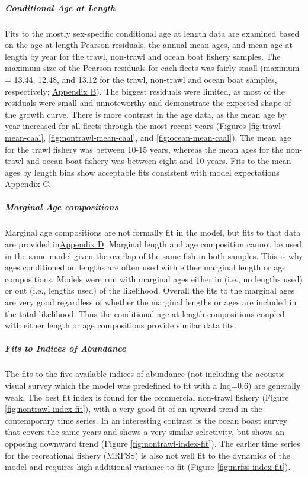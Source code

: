 \documentclass[11pt,
  letterpaper,
]{article}
\begin{document}
\hypertarget{conditional-age-at-length}{%
\subparagraph{Conditional Age at Length}\label{conditional-age-at-length}}

Fits to the mostly sex-specific conditional age at length data are examined based on the age-at-length Pearson residuals, the annual mean ages, and mean age at length by year for the trawl, non-trawl and ocean boat fishery samples. The maximum size of the Pearson residuals for each fleets was fairly small (maximum = 13.44, 12.48, and 13.12 for the trawl, non-trawl and ocean boat samples, respectively; \protect\hyperlink{app_b}{Appendix B}). The biggest residuals were limited, as most of the residuals were small and unnoteworthy and demonstrate the expected shape of the growth curve. There is more contrast in the age data, as the mean age by year increased for all fleets through the most recent years (Figures \ref{fig:trawl-mean-caal}, \ref{fig:nontrawl-mean-caal}, and \ref{fig:ocean-mean-caal}). The mean age for the trawl fishery was between 10-15 years, whereas the mean ages for the non-trawl and ocean boat fishery was between eight and 10 years. Fits to the mean ages by length bins show acceptable fits consistent with model expectations \protect\hyperlink{app_c}{Appendix C}.

\hypertarget{marginal-age-compositions}{%
\subparagraph{Marginal Age compositions}\label{marginal-age-compositions}}

Marginal age compositions are not formally fit in the model, but fits to that data are provided in\protect\hyperlink{app_d}{Appendix D}. Marginal length and age composition cannot be used in the same model given the overlap of the same fish in both samples. This is why ages conditioned on lengths are often used with either marginal length or age compositions. Models were run with marginal ages either in (i.e., no lengths used) or out (i.e., lengths used) of the likelihood. Overall the fits to the marginal ages are very good regardless of whether the marginal lengths or ages are included in the total likelihood. Thus the conditional age at length compositions coupled with either length or age compositions provide similar data fits.

\hypertarget{fits-to-indices-of-abundance}{%
\subparagraph{Fits to Indices of Abundance}\label{fits-to-indices-of-abundance}}

The fits to the five available indices of abundance (not including the acoustic-visual survey which the model was predefined to fit with a lnq=0.6) are generally weak. The best fit index is found for the commercial non-trawl fishery (Figure \ref{fig:nontrawl-index-fit}), with a very good fit of an upward trend in the contemporary time series. In an interesting contrast is the ocean boast survey that covers the same years and shows a very similar selectivity, but shows an opposing downward trend (Figure \ref{fig:nontrawl-index-fit}). The earlier time series for the recreational fishery (MRFSS) is also not well fit to the dynamics of the model and requires high additional variance to fit (Figure \ref{fig:mrfss-index-fit}).
\end{document}
